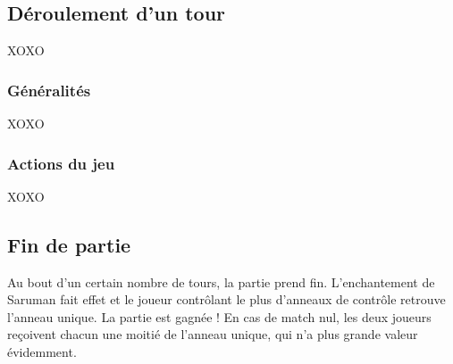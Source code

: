 \subsection{Déroulement d'un tour}

XOXO

\subsubsection{Généralités}

XOXO

\subsubsection{Actions du jeu}

XOXO

\subsection{Fin de partie}

Au bout d'un certain nombre de tours, la partie prend fin. 
\newline
L'enchantement de Saruman fait effet et le joueur contrôlant le plus d'anneaux de contrôle retrouve l'anneau unique. 
\newline
\newline
La partie est gagnée !
\newline
\newline
En cas de match nul, les deux joueurs reçoivent chacun une moitié de l'anneau unique, qui n'a plus grande valeur évidemment.